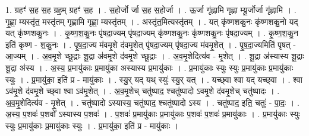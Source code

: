 \documentclass[17pt]{extarticle}
\begin{document}
1. ग्रहꣳ॑ स॒ह स॒ह ग्रह॒म् ग्रहꣳ॑ स॒ह । . स॒होर्जो र्जा स॒ह स॒होर्जा । . ऊ॒र्जा गृ॑ह्णामि गृह्णा म्यू॒र्जोर्जा गृ॑ह्णामि । . गृ॒ह्णा॒ म्यस्तृ॑त॒ मस्तृ॑तम् गृह्णामि गृह्णा॒ म्यस्तृ॑तम् । . अस्तृ॑त॒मित्यस्तृ॑तम् । . यत् कृ॑ष्णशकु॒नः कृ॑ष्णशकु॒नो यद् यत् कृ॑ष्णशकु॒नः । . कृ॒ष्ण॒श॒कु॒नः पृ॑षदा॒ज्यम् पृ॑षदा॒ज्यम् कृ॑ष्णशकु॒नः कृ॑ष्णशकु॒नः पृ॑षदा॒ज्यम् । . कृ॒ष्ण॒श॒कु॒न इति॑ कृष्ण - श॒कु॒नः । . पृ॒ष॒दा॒ज्य म॑वमृ॒शे द॑वमृ॒शेत् पृ॑षदा॒ज्यम् पृ॑षदा॒ज्य म॑वमृ॒शेत् । . पृ॒ष॒दा॒ज्यमिति॑ पृषत् - आ॒ज्यम् । . अ॒व॒मृ॒शे च्छू॒द्राः शू॒द्रा अ॑वमृ॒शे द॑वमृ॒शे च्छू॒द्राः । . अ॒व॒मृ॒शेदित्य॑व - मृ॒शेत् । . शू॒द्रा अ॑स्यास्य शू॒द्राः शू॒द्रा अ॑स्य । . अ॒स्य॒ प्र॒मायु॑काः प्र॒मायु॑का अस्यास्य प्र॒मायु॑काः । . प्र॒मायु॑काः स्युः स्युः प्र॒मायु॑काः प्र॒मायु॑काः स्युः । . प्र॒मायु॑का॒ इति॑ प्र - मायु॑काः । . स्यु॒र् यद् यथ् स्युः॑ स्यु॒र् यत् । . यच्छ्‌वा श्वा यद् यच्छ्‌वा । . श्वा ऽव॑मृ॒शे द॑वमृ॒शे च्छ्‌वा श्वा ऽव॑मृ॒शेत् । . अ॒व॒मृ॒शेच् चतु॑ष्पाद॒ श्चतु॑ष्पादो ऽवमृ॒शे द॑वमृ॒शेच् चतु॑ष्पादः । . अ॒व॒मृ॒शेदित्य॑व - मृ॒शेत् । . चतु॑ष्पादो ऽस्यास्य॒ चतु॑ष्पाद॒ श्चतु॑ष्पादो ऽस्य । . चतु॑ष्पाद॒ इति॒ चतुः॑ - पा॒दः॒ । . अ॒स्य॒ प॒शवः॑ प॒शवो᳚ ऽस्यास्य प॒शवः॑ । . प॒शवः॑ प्र॒मायु॑काः प्र॒मायु॑काः प॒शवः॑ प॒शवः॑ प्र॒मायु॑काः । . प्र॒मायु॑काः स्युः स्युः प्र॒मायु॑काः प्र॒मायु॑काः स्युः । . प्र॒मायु॑का॒ इति॑ प्र - मायु॑काः । \newline
\end{document}
